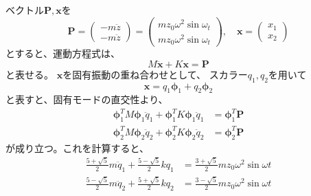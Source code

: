 \documentclass[a4paper]{jsarticle}
\begin{document}
\subsection{}
ベクトル$\boldsymbol{P}, \boldsymbol{x}$を
\begin{equation}
  \boldsymbol{P} =
  \begin{pmatrix}
    -m \ddot{z} \\
    -m \ddot{z}
  \end{pmatrix} =
  \begin{pmatrix}
    m z_0 \omega^2 \sin \omega_t \\
    m z_0 \omega^2 \sin \omega_t
  \end{pmatrix}, \quad
  \boldsymbol{x} =
  \begin{pmatrix}
    x_1 \\ x_2
  \end{pmatrix}
\end{equation}
とすると、運動方程式は、
\begin{equation}
  M \ddot{\boldsymbol{x}} + K \boldsymbol{x} = \boldsymbol{P}
\end{equation}
と表せる。
$\boldsymbol{x}$を固有振動の重ね合わせとして、
スカラー$q_1, q_2$を用いて
\begin{equation}
  \boldsymbol{x}
  = q_1 \boldsymbol{\phi}_1 + q_2 \boldsymbol{\phi}_2
\end{equation}
と表すと、固有モードの直交性より、
\begin{equation}
  \begin{aligned}
    \boldsymbol{\phi}_1^T M \boldsymbol{\phi}_1 \ddot{q}_1
    + \boldsymbol{\phi}_1^T K \boldsymbol{\phi}_1 \ddot{q}_1
    &= \boldsymbol{\phi}_1^T \boldsymbol{P} \\
    \boldsymbol{\phi}_2^T M \boldsymbol{\phi}_2 \ddot{q}_2
    + \boldsymbol{\phi}_2^T K \boldsymbol{\phi}_2 \ddot{q}_2
    &= \boldsymbol{\phi}_2^T \boldsymbol{P}
  \end{aligned}
\end{equation}
が成り立つ。これを計算すると、
\begin{equation}
  \begin{aligned}
    \frac{5 + \sqrt{5}}{2} m \ddot{q}_1
    + \frac{5 - \sqrt{5}}{2} k q_1
    &= \frac{3 + \sqrt{5}}{2} m z_0 \omega^2 \sin \omega t \\
    \frac{5 - \sqrt{5}}{2} m \ddot{q}_2
    + \frac{5 + \sqrt{5}}{2} k q_2
    &= \frac{3 - \sqrt{5}}{2} m z_0 \omega^2 \sin \omega t \\
  \end{aligned}
\end{equation}
\end{document}
